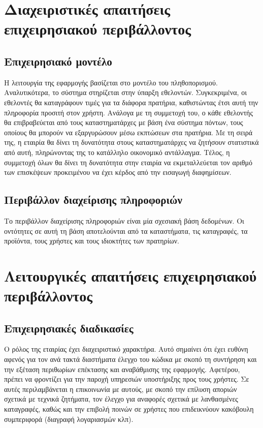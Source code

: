 \documentclass[a4paper,oneside, 12pt]{article}
\begin{document}
\section{Διαχειριστικές απαιτήσεις επιχειρησιακού περιβάλλοντος}
\subsection{Επιχειρησιακό μοντέλο}
Η λειτουργία της εφαρμογής βασίζεται στο μοντέλο του πληθοπορισμού.
Αναλυτικότερα, το σύστημα στηρίζεται στην ύπαρξη εθελοντών. Συγκεκριμένα,
οι εθελοντές θα καταγράφουν τιμές για τα διάφορα πρατήρια, καθιστώντας έτσι
αυτή την πληροφορία προσιτή στον χρήστη. Ανάλογα με τη συμμετοχή του, ο
κάθε εθελοντής θα επιβραβεύεται από τους καταστηματάρχες με βάση ένα
σύστημα πόντων, τους οποίους θα μπορούν να εξαργυρώσουν μέσω εκπτώσεων
στα πρατήρια. Με τη σειρά της, η εταιρία θα δίνει τη δυνατότητα στους
καταστηματάρχες να ζητήσουν στατιστικά από αυτή, πληρώνοντας της το
κατάλληλο οικονομικό αντάλλαγμα. Τέλος, η συμμετοχή όλων θα δίνει τη
δυνατότητα στην εταιρία να εκμεταλλεύεται τον αριθμό των επισκέψεων
προκειμένου να έχει κέρδος από την εισαγωγή διαφημίσεων.

\subsection{Περιβάλλον διαχείρισης πληροφοριών}

Το περιβάλλον διαχείρισης πληροφοριών είναι μία σχεσιακή βάση δεδομένων. Οι
οντότητες σε αυτή τη βάση αποτελούνται από τα καταστήματα, τις
καταγραφές, τα προϊόντα, τους χρήστες και τους ιδιοκτήτες των πρατηρίων.

\section{Λειτουργικές απαιτήσεις επιχειρησιακού περιβάλλοντος}
\subsection{Επιχειρησιακές διαδικασίες}
Ο ρόλος της εταιρίας έχει διαχειριστικό χαρακτήρα. Αυτό σημαίνει ότι έχει
ευθύνη αφενός για τον ανά τακτά διαστήματα έλεγχο του κώδικα με σκοπό τη
συντήρηση και την εξέταση περιθωρίων επέκτασης και αναβάθμισης της εφαρμογής.
Αφετέρου, πρέπει να φροντίζει για την παροχή υπηρεσιών υποστήριξης προς
τους χρήστες. Σε αυτές περιλαμβάνεται η επικοινωνία με αυτούς, με σκοπό την
επίλυση αποριών σχετικά με τεχνικά ζητήματα, τον έλεγχο για αναφορές
σχετικά με λανθασμένες καταγραφές, καθώς και την επιβολή ποινών σε χρήστες
που επιδεικνύουν κακόβουλη συμπεριφορά (διαγραφή λογαριασμών κλπ).
\end{document}
